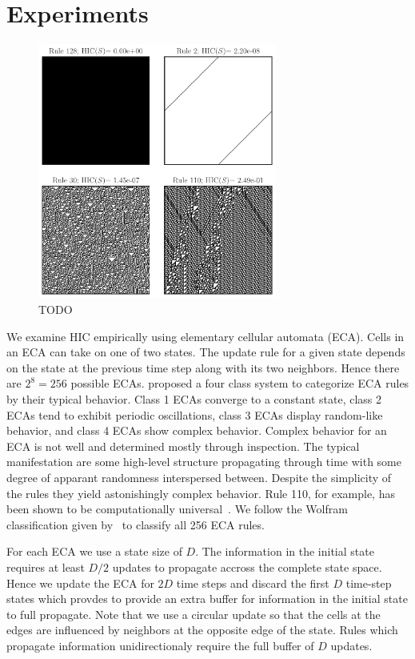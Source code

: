 \section{Experiments}

\begin{figure}[ht]
\centering
\includegraphics[width=0.7\textwidth]{figures/eca_images_and_hic}
\caption{TODO}
\label{fig:eca_images_and_hic}
\end{figure}

We examine HIC empirically using elementary cellular automata (ECA). Cells in
an ECA can take on one of two states. The update rule for a given state depends
on the state at the previous time step along with its two neighbors. Hence
there are $2^8 = 256$ possible ECAs. \citet{wolfram1983} proposed a four class
system to categorize ECA rules by their typical behavior. Class 1 ECAs converge
to a constant state, class 2 ECAs tend to exhibit periodic oscillations, class
3 ECAs display random-like behavior, and class 4 ECAs show complex behavior.
Complex behavior for an ECA is not well and determined mostly through
inspection. The typical manifestation are some high-level structure propagating
through time with some degree of apparant randomness interspersed between.
Despite the simplicity of the rules they yield astonishingly complex behavior.
Rule 110, for example, has been shown to be computationally
universal~\citep{cook2004universality}. We follow the Wolfram classification
given by~\citet[table 2]{martinez2013note} to classify all 256 ECA rules.

For each ECA we use a state size of $D$. The information in the initial state
requires at least $D/2$ updates to propagate accross the complete state space.
Hence we update the ECA for $2D$ time steps and discard the first $D$ time-step
states which provdes to provide an extra buffer for information in the initial
state to full propagate. Note that we use a circular update so that the cells
at the edges are influenced by neighbors at the opposite edge of the state.
Rules which propagate information unidirectionaly require the full buffer of
$D$ updates.

